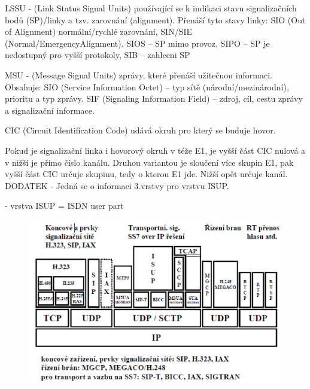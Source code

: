 LSSU - (Link Status Signal Units) používající se k indikaci stavu signalizačních bodů (SP)/linky a tzv. zarovnání (alignment). Přenáší tyto stavy linky: SIO (Out of Alignment) normální/rychlé zarovnání, SIN/SIE (Normal/EmergencyAlignment). SIOS -- SP mimo provoz, SIPO -- SP je nedostupný pro vyšší protokoly, SIB -- zahlceni SP

MSU - (Message Signal Units) zprávy, které přenáší užitečnou informaci. Obsahuje: SIO (Service Information Octet) -- typ sítě (národní/mezinárodní), prioritu a typ zprávy. SIF (Signaling Information Field) -- zdroj, cíl, cestu zprávy a signalizační informace.


CIC (Circuit Identification Code) udává okruh pro který se buduje hovor.

Pokud je signalizační linka i hovorový okruh v téže E1, je vyšší část CIC nulová a v nižší je přímo číslo kanálu. Druhou variantou je sloučení více skupin E1, pak vyšší část CIC určuje skupinu, tedy o kterou E1 jde. Nižší opět určuje kanál. DODATEK - Jedná se o informaci 3.vrstvy pro vrstvu ISUP.


- vrstva ISUP = ISDN user part

\begin{figure}[h!]
    \begin{center}
        \includegraphics[width=\textwidth]{images/otazka25.png}
        \label{img:10}
    \end{center}
\end{figure}

